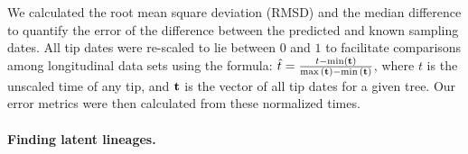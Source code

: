 \documentclass{bmcart}
\begin{document}
We calculated the root mean square deviation (RMSD) and the median difference to quantify the error of the difference between the predicted and known sampling dates.
All tip dates were re-scaled to lie between $0$ and $1$ to facilitate comparisons among longitudinal data sets using the formula: $\hat{t} = \frac{t - \min(\bf{t}) }{ \max{(\bf{t})} - \min{(\bf{t}})}$, where $t$ is the unscaled time of any tip, and $\bf{t}$ is the vector of all tip dates for a given tree. 
Our error metrics were then calculated from these normalized times.%

\paragraph {Finding latent lineages.} \label{subsec:experiments}

%
%
%
\end{document}
